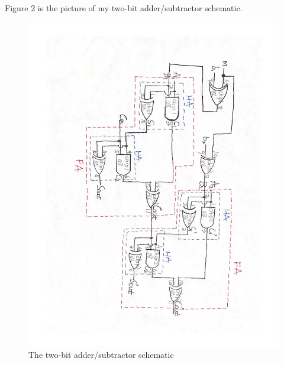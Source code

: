 \documentclass[11pt]{article}
\begin{document}
	Figure 2 is the picture of my two-bit adder/subtractor schematic.\\
	\begin{figure}[ht]\centering
		\includegraphics[width=1.0\textwidth]{Schematic}
		\caption{The two-bit adder/subtractor schematic}
		\label{fig:Schematic}
	\end{figure}
	
\end{document}
